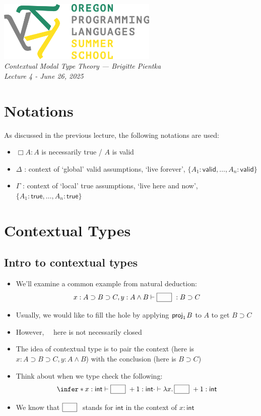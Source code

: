 \documentclass[11pt]{article}
\newcommand{\valid}[1]{\ensuremath{#1 :\textsf{valid}}}
\newcommand{\true}[1]{\ensuremath{#1 \textsf{true}}}
\newcommand{\projl}[1]{\ensuremath{\textsf{proj}_1\mkern2mu#1}}
\newcommand{\abs}[2]{\ensuremath{\lambda #1.\,#2}}
\newcommand{\hole}{\fbox{\rule{1.5em}{0pt}\rule{0pt}{0.6em}}\ }
\begin{document}
\thispagestyle{plain}
\begin{center}
\includegraphics[width=3in]{oplssLogo.png}\\[2\parskip]
\sffamily \LARGE \slshape Contextual Modal Type Theory
--- \upshape Brigitte Pientka \\[2ex]
\large Lecture 4 - \slshape June 26, 2025
\end{center}

\section{Notations}
As discussed in the previous lecture, the following notations are used:
\begin{itemize}
    \item $\Box A : A$ is necessarily true / $A$ is valid
    \item $\Delta$ : context of `global' valid assumptions, `live forever', $\{\valid{A_1},\ldots,\valid{A_n}\}$
    \item $\Gamma$ : context of `local' true assumptions, `live here and now', $\{\true{A_1 :},\ldots,\true{A_n :}\}$
\end{itemize}

\section{Contextual Types}
\subsection{Intro to contextual types}
\begin{itemize}
    \item We'll examine a common example from natural deduction: \[x : A \supset B \supset C, y : A \land B \vdash \hole : B \supset C\]
    \item Usually, we would like to fill the hole by applying \projl{B} to $A$ to get $B \supset C$
    \item However, \hole \, here is not necessarily closed
    \item The idea of contextual type is to pair the context (here is $x : A \supset B \supset C, y : A \land B$) with the conclusion (here is $B \supset C$)\cite{Nanevski2008ContextualModalTypeTheory}
    \item Think about when we type check the following:
        \begin{equation}\label{ex1}
            \infer*{x : \textsf{int} \vdash \hole + 1: \textsf{int}}{\cdot \vdash \abs{x}{\hole + 1} : \textsf{int}}
        \end{equation}
    \item We know that $\hole$ stands for $\textsf{int}$ in the context of $x : \textsf{int}$
\end{itemize}
\end{document}
